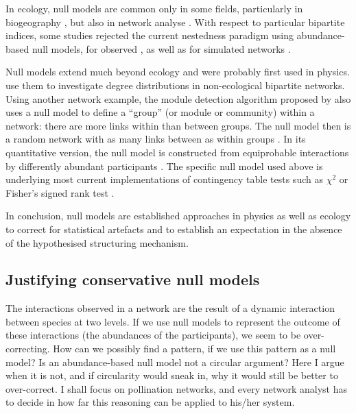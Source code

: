 \documentclass[a4paper, 11pt]{article}\usepackage[]{graphicx}\usepackage[]{color}
\newcommand{\ind}[1]{#1\index{#1}}           			   %
\begin{document}
In ecology, \ind{null model}s are common only in some fields, particularly in biogeography \citep{Gotelli1996,Hausdorf2007}, but also in network analyse \citep{Dormann2009,Joppa2009,Bluthgen2008,Vazquez2006,Vazquez2003a,Vazquez2009}. With respect to particular bipartite indices, some studies rejected the current nestedness paradigm using abundance-based null models, for observed \citep{Kallimanis2009,Moore2007,Santamaria2007}, as well as for simulated networks \citep{Krishna2008}.

Null models extend much beyond ecology and were probably first used in physics. \citet{Latapy2008} use them to investigate degree distributions in non-ecological bipartite networks. Using another network example, the module detection algorithm proposed by \citet{Newman2004} also uses a null model to define a ``group'' (or module or community) within a network: there are more links within than between groups. The null model then is a random network with as many links between as within groups \citep{Guimera2005}. In its quantitative version, the null model is constructed from equiprobable interactions by differently abundant participants \citep{Barber2004}. The specific null model used above is underlying most current implementations of contingency table tests such as $\chi^2$ or Fisher's signed rank test \citep{Patefield1981}.

In conclusion, null models are established approaches in physics as well as ecology to correct for statistical artefacts and to establish an expectation in the absence of the hypothesised structuring mechanism.

\subsection{Justifying conservative null models}
The interactions observed in a network are the result of a dynamic interaction between species at two levels. If we use null models to represent the outcome of these interactions (the abundances of the participants), we seem to be over-correcting. How can we possibly find a pattern, if we use this pattern as a null model? Is an abundance-based null model not a circular argument? Here I argue when it is not, and if \ind{circularity} would sneak in, why it would still be better to over-correct. I shall focus on pollination networks, and every network analyst has to decide in how far this reasoning can be applied to his/her system.
\end{document}
